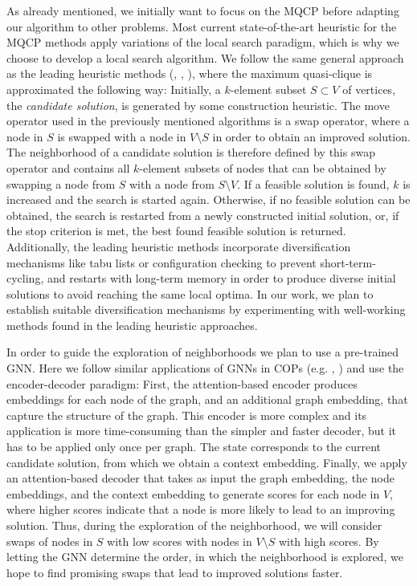 \documentclass[11pt]{article}
\begin{document}
As already mentioned, we initially want to focus on the MQCP before adapting our algorithm to other problems. Most current state-of-the-art heuristic for the MQCP methods apply variations of the local search paradigm, which is why we choose to develop a local search algorithm. We follow the same general approach as the leading heuristic methods (\cite{djeddi_extension_2019}, \cite{zhou_opposition-based_2020}, \cite{chen_nuqclq_2021}), where the maximum quasi-clique is approximated the following way: Initially, a $k$-element subset $S \subset V$ of vertices, the \textit{candidate solution}, is generated by some construction heuristic. The move operator used in the previously mentioned algorithms is a swap operator, where a node in $S$ is swapped with a node in $V \setminus S$ in order to obtain an improved solution. The neighborhood of a candidate solution is therefore defined by this swap operator and contains all $k$-element subsets of nodes that can be obtained by swapping a node from $S$ with a node from $S \setminus V$. If a feasible solution is found, $k$ is increased and the search is started again. Otherwise, if no feasible solution can be obtained, the search is restarted from a newly constructed initial solution, or, if the stop criterion is met, the best found feasible solution is returned. Additionally, the leading heuristic methods incorporate diversification mechanisms like tabu lists or configuration checking to prevent short-term-cycling, and restarts with long-term memory in order to produce diverse initial solutions to avoid reaching the same local optima. In our work, we plan to establish suitable diversification mechanisms by experimenting with well-working methods found in the leading heuristic approaches. 

In order to guide the exploration of neighborhoods we plan to use a pre-trained GNN. Here we follow similar applications of GNNs in COPs (e.g. \cite{Kool2019}, \cite{Hudson2021}) and use the encoder-decoder paradigm: First, the attention-based encoder produces embeddings for each node of the graph, and an additional graph embedding, that capture the structure of the graph. This encoder is more complex and its application is more time-consuming than the simpler and faster decoder, but it has to be applied only once per graph. The state corresponds to the current candidate solution, from which we obtain a context embedding. Finally, we apply an attention-based decoder that takes as input the graph embedding, the node embeddings, and the context embedding to generate scores for each node in $V$, where higher scores indicate that a node is more likely to lead to an improving solution. Thus, during the exploration of the neighborhood, we will consider swaps of nodes in $S$ with low scores with nodes in $V \setminus S$ with high scores. By letting the GNN determine the order, in which the neighborhood is explored, we hope to find promising swaps that lead to improved solutions faster. 
\end{document}
